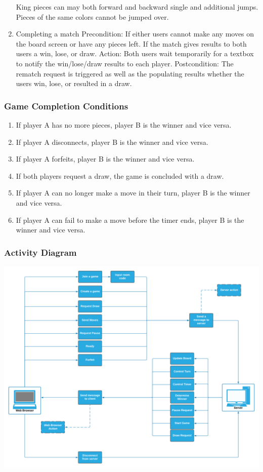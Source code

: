 \documentclass[10pt]{article}
\begin{document}
\begin{enumerate}
        \subitem King pieces can may both forward and backward single and additional jumps.
        \subitem Pieces of the same colors cannot be jumped over.
    \item Completing a match
        \subitem Precondition:
            \subsubitem If either users cannot make any moves on the board screen or have any pieces left.
            \subsubitem If the match gives results to both users a win, lose, or draw.
        \subitem Action: Both users wait temporarily for a textbox to notify the win/lose/draw results to each player.
        \subitem Postcondition: The rematch request is triggered as well as the populating results whether the users win, lose, or resulted in a draw.
\end{enumerate}

\subsubsection{Game Completion Conditions}

\begin{enumerate}
    \item If player A has no more pieces, player B is the winner and vice versa.
    \item If player A disconnects, player B is the winner and vice versa.
    \item If player A forfeits, player B is the winner and vice versa.
    \item If both players request a draw, the game is concluded with a draw.
    \item If player A can no longer make a move in their turn, player B is the winner and vice versa.
    \item If player A can fail to make a move before the timer ends, player B is the winner and vice versa.
\end{enumerate}

\subsubsection{Activity Diagram}
\includegraphics[width=16cm]{UseCaseDiagram.png}
\end{document}
